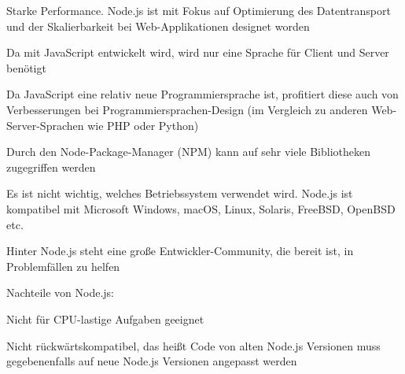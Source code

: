 \begin{compactitem}
    \item Starke Performance. Node.js ist mit Fokus auf Optimierung des Datentransport und der Skalierbarkeit bei Web-Applikationen designet worden
    \item Da mit JavaScript entwickelt wird, wird nur eine Sprache für Client und Server benötigt
    \item Da JavaScript eine relativ neue Programmiersprache ist, profitiert diese auch von Verbesserungen bei Programmiersprachen-Design (im Vergleich zu anderen Web-Server-Sprachen wie PHP oder Python)
    \item Durch den Node-Package-Manager (NPM) kann auf sehr viele Bibliotheken zugegriffen werden
    \item Es ist nicht wichtig, welches Betriebssystem verwendet wird. Node.js ist kompatibel mit Microsoft Windows, macOS, Linux, Solaris, FreeBSD, OpenBSD etc.
    \item Hinter Node.js steht eine große Entwickler-Community, die bereit ist, in Problemfällen zu helfen
\end{compactitem}

Nachteile von Node.js: \cite{nodejs_nachteile}

\begin{compactitem}
    \item Nicht für CPU-lastige Aufgaben geeignet
    \item Nicht rückwärtskompatibel, das heißt Code von alten Node.js Versionen muss gegebenenfalls auf neue Node.js Versionen angepasst werden
\end{compactitem}




